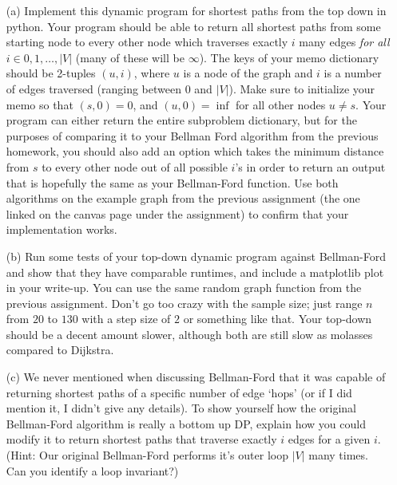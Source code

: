 \documentclass[12pt]{article}
\begin{document}
\begin{enumerate}
     \begin{itemize}
        \item[(a)] Implement this dynamic program for shortest paths from the top down in python. Your program should be able to return all shortest paths from some starting node to every other node which traverses exactly $i$ many edges \emph{for all $i \in 0,1,\ldots,|V|$} (many of these will be $\infty$). The keys of your memo dictionary should be 2-tuples $(u,i)$, where $u$ is a node of the graph and $i$ is a number of edges traversed (ranging between $0$ and $|V|$). Make sure to initialize your memo so that $(s,0) = 0$, and $(u,0) = \inf$ for all other nodes $u \neq s$. Your program can either return the entire subproblem dictionary, but for the purposes of comparing it to your Bellman Ford algorithm from the previous homework, you should also add an option which takes the minimum distance from $s$ to every other node out of all possible $i$'s in order to return an output that is hopefully the same as your Bellman-Ford function. Use both algorithms on the example graph from the previous assignment (the one linked on the canvas page under the assignment) to confirm that your implementation works.
        \item[(b)] Run some tests of your top-down dynamic program against Bellman-Ford and show that they have comparable runtimes, and include a matplotlib plot in your write-up. You can use the same random graph function from the previous assignment. Don't go too crazy with the sample size; just range $n$ from $20$ to $130$ with a step size of $2$ or something like that. Your top-down should be a decent amount slower, although both are still slow as molasses compared to Dijkstra. \
        \item[(c)] We never mentioned when discussing Bellman-Ford that it was capable of returning shortest paths of a specific number of edge `hops' (or if I did mention it, I didn't give any details). To show yourself how the original Bellman-Ford algorithm is really a bottom up DP, explain how you could modify it to return shortest paths that traverse exactly $i$ edges for a given $i$. (Hint: Our original Bellman-Ford performs it's outer loop $|V|$ many times. Can you identify a loop invariant?) 
     \end{itemize}
\end{enumerate}
\end{document}
